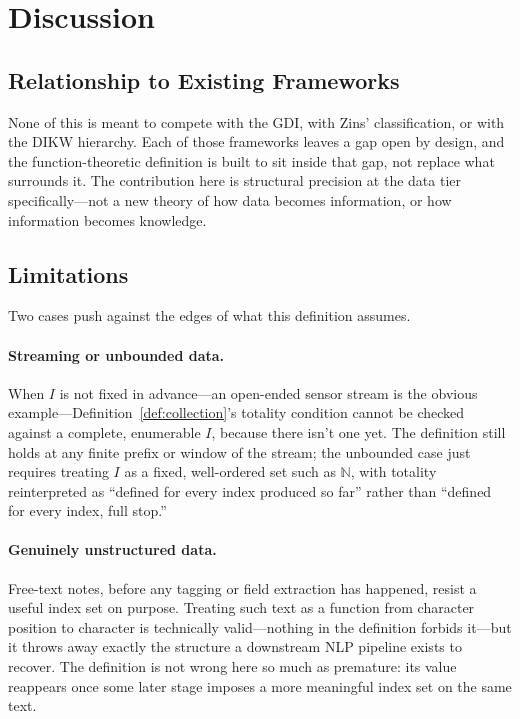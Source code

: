 \section{Discussion}
\label{sec:discussion}

\subsection{Relationship to Existing Frameworks}

None of this is meant to compete with the GDI, with Zins' classification,
or with the DIKW hierarchy. Each of those frameworks leaves a gap open by
design, and the function-theoretic definition is built to sit inside that
gap, not replace what surrounds it. The contribution here is structural
precision at the data tier specifically---not a new theory of how data
becomes information, or how information becomes knowledge.

\subsection{Limitations}

Two cases push against the edges of what this definition assumes.

\paragraph{Streaming or unbounded data.}
When $I$ is not fixed in advance---an open-ended sensor stream is the
obvious example---Definition~\ref{def:collection}'s totality condition
cannot be checked against a complete, enumerable $I$, because there isn't
one yet. The definition still holds at any finite prefix or window of the
stream; the unbounded case just requires treating $I$ as a fixed,
well-ordered set such as $\mathbb{N}$, with totality reinterpreted as
``defined for every index produced so far'' rather than ``defined for
every index, full stop.''

\paragraph{Genuinely unstructured data.}
Free-text notes, before any tagging or field extraction has happened,
resist a useful index set on purpose. Treating such text as a function
from character position to character is technically valid---nothing in
the definition forbids it---but it throws away exactly the structure a
downstream NLP pipeline exists to recover. The definition is not wrong
here so much as premature: its value reappears once some later stage
imposes a more meaningful index set on the same text.

